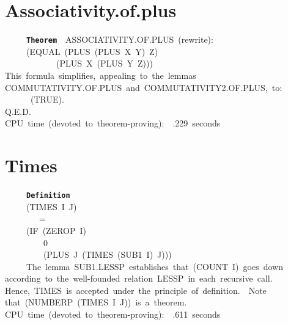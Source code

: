 \documentclass[11pt]{book}
\newenvironment{pubasis}{\begin{flushleft}\ttfamily\small}{\normalsize\rmfamily\end{flushleft}}
\newcommand{\axiomordefinition}[1]{\vspace{6pt}\texttt{\textbf{#1}}}
\newcommand{\pubdefaulttextsize}{\large}
\begin{document}
\section{Associativity.of.plus}
\pubdefaulttextsize
\begin{pubasis}
~~~~~\axiomordefinition{Theorem}~~ASSOC\-IATIV\-ITY.OF.PLUS~(rewrite):\\
~~~~~(EQUAL~(PLUS~(PLUS~X~Y)~Z)\\
~~~~~~~~~~~~(PLUS~X~(PLUS~Y~Z)))\\

This~formula~simplifies,~appealing~to~the~lemmas\\
COM\-MU\-TA\-TIV\-ITY.OF.PLUS~and~COM\-MU\-TA\-TIV\-ITY2.OF.PLUS,~to:\\

~~~~~~(TRUE).\\

Q.E.D.\\

CPU~time~(devoted~to~theorem-proving):~~.229~seconds\\
\end{pubasis}
\section{Times}
\pubdefaulttextsize
\begin{pubasis}
~~~~~\axiomordefinition{Definition}\\
~~~~~(TIMES~I~J)\\
~~~~~~~~=\\
~~~~~(IF~(ZEROP~I)\\
~~~~~~~~~0\\
~~~~~~~~~(PLUS~J~(TIMES~(SUB1~I)~J)))\\

~~~~~The~lemma~SUB1.LESSP~establishes~that~(COUNT~I)~goes~down\\
according~to~the~well-founded~relation~LESSP~in~each~recursive~call.\\
Hence,~TIMES~is~accepted~under~the~principle~of~definition.~~Note\\
that~(NUMBERP~(TIMES~I~J))~is~a~theorem.\\

CPU~time~(devoted~to~theorem-proving):~~.611~seconds\\
\end{pubasis}
\end{document}
